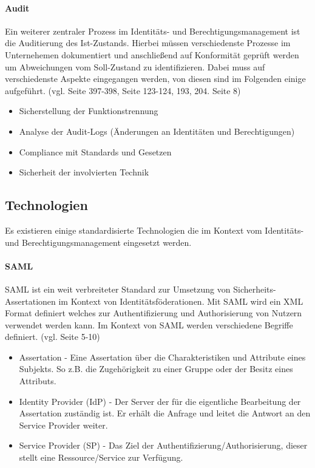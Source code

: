 \documentclass[11pt]{article}
\begin{document}
\paragraph{Audit}
Ein weiterer zentraler Prozess im Identitäts- und Berechtigungsmanagement ist die Auditierung des Ist-Zustands. Hierbei müssen verschiedenste Prozesse im Unternehemen dokumentiert und anschließend auf Konformität geprüft werden um Abweichungen vom Soll-Zustand zu identifizieren. Dabei muss auf verschiedenste Aspekte eingegangen werden, von diesen sind im Folgenden einige aufgeführt. (vgl. \cite{devlekar2022identity} Seite 397-398, \cite{tsolkas2017} Seite 123-124, 193, 204. \cite{haag2012selecting} Seite 8)
\begin{itemize}
  \item Sicherstellung der Funktionstrennung
  \item Analyse der Audit-Logs (Änderungen an Identitäten und Berechtigungen)
  \item Compliance mit Standards und Gesetzen
  \item Sicherheit der involvierten Technik
\end{itemize}
\subsection{Technologien}
Es existieren einige standardisierte Technologien die im Kontext vom Identitäts- und Berechtigungsmanagement eingesetzt werden.
\paragraph{SAML}
SAML ist ein weit verbreiteter Standard zur Umsetzung von Sicherheits-Assertationen im Kontext von Identitätsföderationen. Mit SAML wird ein XML Format definiert welches zur Authentifizierung und Authorisierung von Nutzern verwendet werden kann. Im Kontext von SAML werden verschiedene Begriffe definiert. (vgl. \cite{hughes2005security} Seite 5-10)
\begin{itemize}
  \item Assertation - Eine Assertation über die Charakteristiken und Attribute eines Subjekts. So z.B. die Zugehörigkeit zu einer Gruppe oder der Besitz eines Attributs.
  \item Identity Provider (IdP) - Der Server der für die eigentliche Bearbeitung der Assertation zuständig ist. Er erhält die Anfrage und leitet die Antwort an den Service Provider weiter.
  \item Service Provider (SP) - Das Ziel der Authentifizierung/Authorisierung, dieser stellt eine Ressource/Service zur Verfügung.
\end{itemize}
\end{document}
